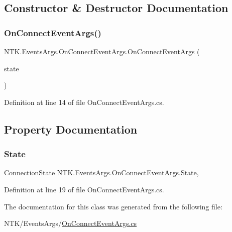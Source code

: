 \subsection{Constructor \& Destructor Documentation}
\mbox{\label{class_n_t_k_1_1_events_args_1_1_on_connect_event_args_a8ee12a801fa6e27a3426cdfd44fd433b}} 
\subsubsection{\texorpdfstring{OnConnectEventArgs()}{OnConnectEventArgs()}}
{\footnotesize\ttfamily N\+T\+K.\+Events\+Args.\+On\+Connect\+Event\+Args.\+On\+Connect\+Event\+Args (\begin{DoxyParamCaption}\item[{Connection\+State}]{state }\end{DoxyParamCaption})}



Definition at line 14 of file On\+Connect\+Event\+Args.\+cs.



\subsection{Property Documentation}
\mbox{\label{class_n_t_k_1_1_events_args_1_1_on_connect_event_args_a0ef5c46529b6983eef215ac3218fa488}} 
\subsubsection{\texorpdfstring{State}{State}}
{\footnotesize\ttfamily Connection\+State N\+T\+K.\+Events\+Args.\+On\+Connect\+Event\+Args.\+State\hspace{0.3cm}{\ttfamily [get]}, {\ttfamily [set]}}



Definition at line 19 of file On\+Connect\+Event\+Args.\+cs.



The documentation for this class was generated from the following file\+:\begin{DoxyCompactItemize}
\item 
N\+T\+K/\+Events\+Args/\mbox{\hyperlink{_on_connect_event_args_8cs}{On\+Connect\+Event\+Args.\+cs}}\end{DoxyCompactItemize}

